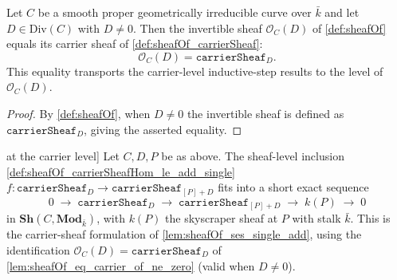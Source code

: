 \begin{lemma}

  \label{lem:sheafOf_eq_carrier_of_ne_zero}
  Let \(C\) be a smooth proper geometrically irreducible curve over \(\bar k\)
  and let \(D \in \mathrm{Div}(C)\) with \(D \neq 0\). Then the invertible
  sheaf \(\mathcal O_C(D)\) of \cref{def:sheafOf} equals its carrier sheaf
  of \cref{def:sheafOf_carrierSheaf}:
  \[
    \mathcal O_C(D) = \texttt{carrierSheaf}_D.
  \]
  This equality transports the carrier-level inductive-step results to the
  level of \(\mathcal O_C(D)\).
\end{lemma}

\begin{proof}
  \leanok
  By \cref{def:sheafOf}, when \(D \neq 0\) the invertible sheaf is defined
  as \(\texttt{carrierSheaf}_D\), giving the asserted equality.
\end{proof}

\begin{theorem}

\leanok
[Short exact sequence for \(D \rightsquigarrow D + [P]\) at the carrier level]
  \label{thm:sheafOf_carrierSheaf_ses_single_add}
  Let \(C, D, P\) be as above. The sheaf-level inclusion
  \cref{def:sheafOf_carrierSheafHom_le_add_single}
  \(f : \texttt{carrierSheaf}_D \to \texttt{carrierSheaf}_{[P]+D}\) fits into a
  short exact sequence
  \[
    0 \;\longrightarrow\; \texttt{carrierSheaf}_D
    \;\longrightarrow\; \texttt{carrierSheaf}_{[P]+D}
    \;\longrightarrow\; k(P)
    \;\longrightarrow\; 0
  \]
  in \(\mathbf{Sh}(C, \mathbf{Mod}_{\bar k})\), with \(k(P)\) the skyscraper
  sheaf at \(P\) with stalk \(\bar k\). This is the carrier-sheaf formulation
  of \cref{lem:sheafOf_ses_single_add}, using the identification
  \(\mathcal O_C(D) = \texttt{carrierSheaf}_D\) of
  \cref{lem:sheafOf_eq_carrier_of_ne_zero} (valid when \(D \neq 0\)).
\end{theorem}

